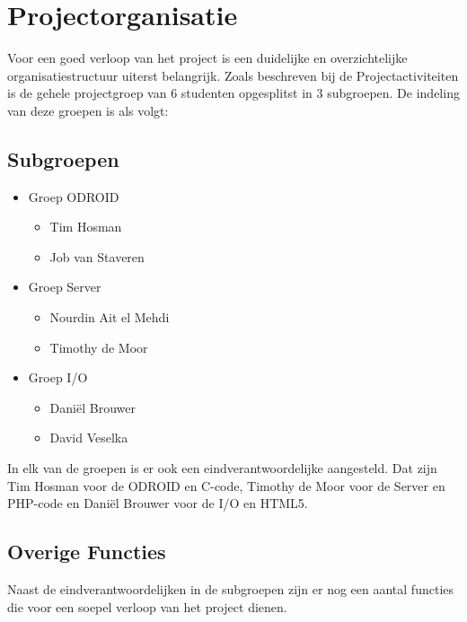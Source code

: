 \section{Projectorganisatie}

Voor een goed verloop van het project is een duidelijke en overzichtelijke organisatiestructuur uiterst belangrijk. Zoals beschreven bij de Projectactiviteiten is de gehele projectgroep van 6 studenten opgesplitst in 3 subgroepen. De indeling van deze groepen is als volgt:

\subsection{Subgroepen}

\begin{itemize}
\item Groep ODROID
	\begin{itemize}
	\item Tim Hosman
	\item Job van Staveren
	\end{itemize}

\item Groep 	Server
	\begin{itemize}
	\item Nourdin Ait el Mehdi
	\item Timothy de Moor
	\end{itemize}

\item Groep I/O
	\begin{itemize}
	\item Dani\"el Brouwer
	\item David Veselka
	\end{itemize}
\end{itemize}

In elk van de groepen is er ook een eindverantwoordelijke aangesteld. Dat zijn Tim Hosman voor de ODROID en C-code, Timothy de Moor voor de Server en PHP-code en Dani\"el Brouwer voor de I/O en HTML5.\\

\subsection{Overige Functies}
Naast de eindverantwoordelijken in de subgroepen zijn er nog een aantal functies die voor een soepel verloop van het project dienen.

